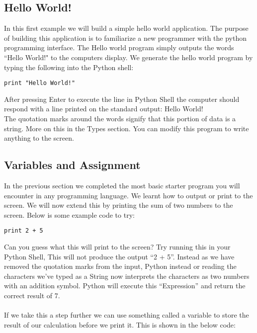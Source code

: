 \documentclass[twocolumn]{article}
\begin{document}
\subsection{Hello World!}

In this first example we will build a simple hello world application. The purpose of building this application is to familiarize a new programmer with the python programming interface. The Hello world program simply outputs the words ``Hello World!" to the computers display. We generate the hello world program by typing the following into the Python shell:\\

\begin{lstlisting}
print "Hello World!"
\end{lstlisting}
After pressing Enter to execute the line in Python Shell the computer should respond with a line printed on the standard output: Hello World!\\ The quotation marks around the words signify that this portion of data is a string. More on this in the Types section. You can modify this program to write anything to the screen.


\subsection{Variables and Assignment}

In the previous section we completed the most basic starter program you will encounter in any programming language. We learnt how to output or print to the screen. We will now extend this by printing the sum of two numbers to the screen. Below is some example code to try:

\begin{lstlisting}
print 2 + 5
\end{lstlisting}
Can you guess what this will print to the screen? Try running this in your Python Shell, This will not produce the output ``2 + 5''. Instead as we have removed the quotation marks from the input, Python instead or reading the characters we've typed as a String now interprets the characters as two numbers with an addition symbol. Python will execute this ``Expression'' and return the correct result of 7. \\
\\
If we take this a step further we can use something called a variable to store the result of our calculation before we print it. This is shown in the below code:
\end{document}
